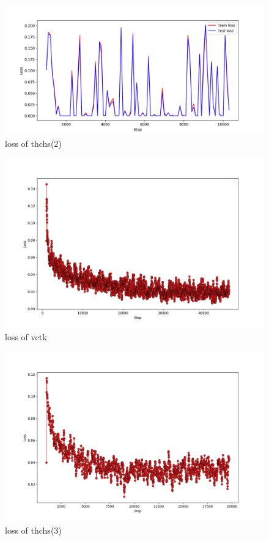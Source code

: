 \documentclass{ctexart}
\begin{document}
    \begin{figure}[h]
        \centering
        \includegraphics[scale=0.3]{thchs(2).png}
        \caption{loss of thchs(2)}
    \end{figure}

    \begin{figure}[h]
        \centering
        \includegraphics[scale=0.3]{vctk.png}
        \caption{loss of vctk}
    \end{figure}

    \begin{figure}[h]
        \centering
        \includegraphics[scale=0.3]{thchs(3).png}
        \caption{loss of thchs(3)}
    \end{figure}
\end{document}
